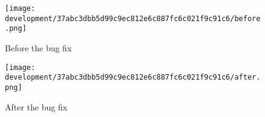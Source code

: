 \documentclass[../development.tex]{subfiles}
\begin{document}
\begin{figure}[H]
	\begin{minipage}{0.48\linewidth}
		\centering
		\texttt{[image: development/37abc3dbb5d99c9ec812e6c887fc6c021f9c91c6/before.png]}
		\caption{Before the bug fix}
		\label{fig:development:37abc3dbb5d99c9ec812e6c887fc6c021f9c91c6:before.png}
	\end{minipage}\hfill
	\begin{minipage}{0.48\linewidth}
		\centering
		\texttt{[image: development/37abc3dbb5d99c9ec812e6c887fc6c021f9c91c6/after.png]}
		\caption{After the bug fix}
		\label{fig:development:37abc3dbb5d99c9ec812e6c887fc6c021f9c91c6:after.png}
	\end{minipage}
\end{figure}
\end{document}
